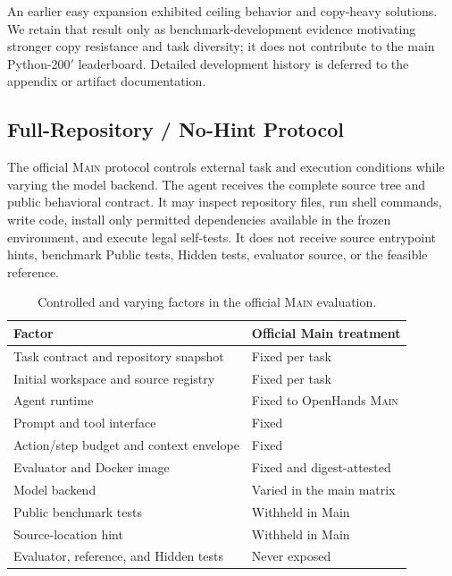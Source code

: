 \documentclass[acmsmall,screen,review,anonymous]{acmart}
\newcommand{\mainprotocol}{\textsc{Main}\xspace}
\begin{document}
An earlier easy expansion exhibited ceiling behavior and copy-heavy solutions.
We retain that result only as benchmark-development evidence motivating stronger
copy resistance and task diversity; it does not contribute to the main
Python-200$'$ leaderboard. Detailed development history is deferred to the
appendix or artifact documentation.

\subsection{Full-Repository / No-Hint Protocol}
\label{sec:protocol}

The official \mainprotocol protocol controls external task and execution
conditions while varying the model backend. The agent receives the complete
source tree and public behavioral contract. It may inspect repository files, run
shell commands, write code, install only permitted dependencies available in the
frozen environment, and execute legal self-tests. It does not receive source
entrypoint hints, benchmark Public tests, Hidden tests, evaluator source, or the
feasible reference.

\begin{table}[t]
  \caption{Controlled and varying factors in the official \mainprotocol evaluation.}
  \label{tab:factors}
  \centering
  \begin{tabularx}{\textwidth}{@{}p{}X@{}}
    \toprule
    \textbf{Factor} & \textbf{Official Main treatment} \\
    \midrule
    Task contract and repository snapshot & Fixed per task \\
    Initial workspace and source registry & Fixed per task \\
    Agent runtime & Fixed to OpenHands \mainprotocol \\
    Prompt and tool interface & Fixed \\
    Action/step budget and context envelope & Fixed \\
    Evaluator and Docker image & Fixed and digest-attested \\
    Model backend & Varied in the main matrix \\
    Public benchmark tests & Withheld in Main \\
    Source-location hint & Withheld in Main \\
    Evaluator, reference, and Hidden tests & Never exposed \\
    \bottomrule
  \end{tabularx}
\end{table}
\end{document}
